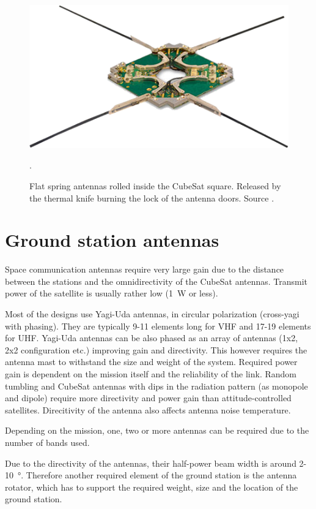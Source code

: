 \begin{figure}[H]
    \centering
    \includegraphics[width=0.5\paperwidth]{img/1/isis_dipole.png}
    \caption{Flat spring antennas rolled inside the CubeSat square. Released by the thermal knife burning the lock of the antenna doors. Source \cite{isis_dipole_antenna}.}.
    \label{isis_dipole_antenna}
\end{figure}

\section{Ground station antennas}
Space communication antennas require very large gain due to the distance between the stations and the omnidirectivity of the CubeSat antennas. Transmit power of the satellite is usually rather low (\SI{1}{\watt} or less).

Most of the designs use Yagi-Uda antennas, in circular polarization (cross-yagi with phasing). They are typically 9-11 elements long for VHF and 17-19 elements for UHF. Yagi-Uda antennas can be also phased as an array of antennas (1x2, 2x2 configuration etc.) improving gain and directivity. This however requires the antenna mast to withstand the size and weight of the system. Required power gain is dependent on the mission itself and the reliability of the link. Random tumbling and CubeSat antennas with dips in the radiation pattern (as monopole and dipole) require more directivity and power gain than attitude-controlled satellites. Direcitivity of the antenna also affects antenna noise temperature.

Depending on the mission, one, two or more antennas can be required due to the number of bands used. 

Due to the directivity of the antennas, their half-power beam width is around \si{2}-\SI{10}{\degree}. Therefore another required element of the ground station is the antenna rotator, which has to support the required weight, size and the location of the ground station.

